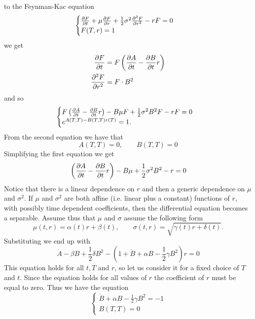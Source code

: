 to the Feynman-Kac equation
\begin{align*}
    \begin{cases}
    \pdv{F}{t} + \mu \pdv{F}{r} + \frac{1}{2}\sigma^2\pdv[2]{F}{r} - rF = 0 \\
    F(T,r) = 1
    \end{cases}
\end{align*}
we get
\begin{align*}
    \pdv{F}{t} &= F\left(\pdv{A}{t} - \pdv{B}{t}r\right) \\
    \pdv[2]{F}{r} &= F\cdot B^2
\end{align*}
and so
\begin{align*}
    \begin{cases}
    F\left(\pdv{A}{t} - \pdv{B}{t}r\right) - B\mu F + \frac{1}{2}\sigma^2 B^2F -rF = 0 \\
    e^{A(T,T)-B(T,T)r(T)} = 1.
    \end{cases}
\end{align*}
From the second equation we have that
\begin{equation}
        A(T,T) = 0, \qquad B(T,T) = 0
\end{equation}
Simplifying the first equation we get
\begin{equation*}
    \left(\pdv{A}{t} - \pdv{B}{t}r\right) - B\mu + \frac{1}{2}\sigma^2 B^2 -r = 0
\end{equation*}
Notice that there is a linear dependence on $r$ and then a generic dependence on $\mu$ and $\sigma^2$. If $\mu$ and $\sigma^2$ are both affine (i.e. linear plus a constant) functions of $r$, with possibly time dependent coefficients, then the differential equation becomes a separable.
Assume thus that $\mu$ and $\sigma$ assume the following form
\begin{equation*}
    \mu(t,r) = \alpha(t)r + \beta(t), \qquad \sigma(t,r) = \sqrt{\gamma(t)r + \delta(t)}.
\end{equation*}
Substituting we end up with
\begin{equation*}
    \dot{A} - \beta B + \frac{1}{2}\delta B^2 - \left(1+\dot{B} + \alpha B - \frac{1}{2}\gamma B^2\right)r = 0
\end{equation*}
This equation holds for all $t, T$ and $r$, so let us consider it for a fixed choice of $T$ and $t$. Since the equation holds for all values of $r$ the coefficient of $r$ must be equal to zero. Thus we have the equation
\begin{equation}\label{Aeq}
    \begin{cases}
        \dot{B} + \alpha B - \frac{1}{2}\gamma B^2 = -1 \\
        B(T,T) = 0
    \end{cases}
\end{equation}
